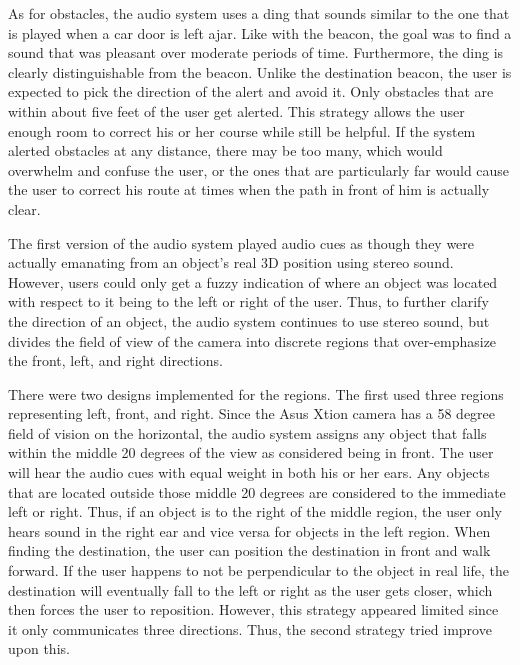 As for obstacles, the audio system uses a ding that sounds similar
to the one that is played when a car door is left ajar. Like with the beacon, 
the goal was to find a sound that was pleasant over moderate periods of time. 
Furthermore, the ding is clearly distinguishable from the beacon. Unlike the
destination beacon, the user is expected to pick the direction of the alert and
avoid it. Only obstacles that are within about five feet of the user get alerted.
This strategy allows the user enough room to correct his or her course while 
still be helpful. If the system alerted obstacles at any distance, there may be 
too many, which would overwhelm and confuse the user, or the ones that are 
particularly far would cause the user to correct his route at times when the 
path in front of him is actually clear.

The first version of the audio system played audio cues as though they were
actually emanating from an object's real 3D position using stereo sound. However,
users could only get a fuzzy indication of where an object was located with 
respect to it being to the left or right of the user. Thus, to further clarify 
the direction of an object, the audio system continues to use stereo sound, but
divides the field of view of the camera into discrete regions that over-emphasize 
the front, left, and right directions. 

There were two designs implemented for the regions. The first used three regions
representing left, front, and right. Since the Asus Xtion camera has a 58 degree
field of vision on the horizontal, the audio system assigns any object that
falls within the middle 20 degrees of the view as considered being in front. The
user will hear the audio cues with equal weight in both his or her ears. Any
objects that are located outside those middle 20 degrees are considered to the
immediate left or right. Thus, if an object is to the right of the middle region,
the user only hears sound in the right ear and vice versa for objects in the
left region. When finding the destination, the user can position the destination
in front and walk forward. If the user happens to not be perpendicular to the
object in real life, the destination will eventually fall to the left or right
as the user gets closer, which then forces the user to reposition. However, this
strategy appeared limited since it only communicates three directions. Thus, the
second strategy tried improve upon this.

